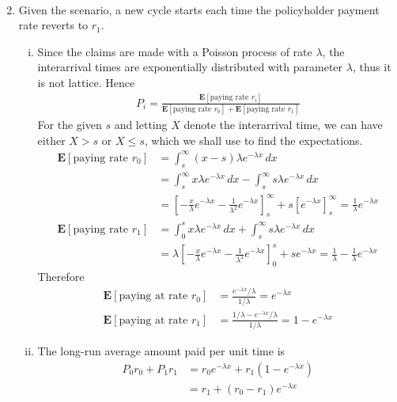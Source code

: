 \documentclass[a4paper,10pt]{article}
\theoremstyle{definition}
\begin{document}
\begin{enumerate}
\begin{align*}
\end{align*}
\item Given the scenario, a new cycle starts each time the policyholder payment rate reverts to $r_1$. 
\begin{enumerate}[(i)]
\item Since the claims are made with a Poisson process of rate $\lambda$, the interarrival times are exponentially distributed with parameter $\lambda$, thus it is not lattice. Hence
\begin{align*}
P_i=\frac{\mathbf{E}[\text{paying rate } r_i]}{\mathbf{E}[\text{paying rate } r_0]+\mathbf{E}[\text{paying rate } r_1]}
\end{align*}
For the given $s$ and letting $X$ denote the interarrival time, we can have either $X>s$ or $X \leq s$, which we shall use to find the expectations.
\begin{align*}
\mathbf{E}[\text{paying rate } r_0] &=\int_{s}^{\infty}(x-s)\lambda e^{-\lambda x}\,dx\\
&=\int_{s}^{\infty}x\lambda e^{-\lambda x}\,dx-\int_{s}^{\infty}s\lambda e^{-\lambda x}\,dx\\
&=\left[-\frac{x}{\lambda}e^{-\lambda x}-\frac{1}{\lambda^2}e^{-\lambda x}\right]_{s}^{\infty}+ s\left[e^{-\lambda x}\right]_{s}^{\infty}=\frac{1}{\lambda}e^{-\lambda x}\\
\mathbf{E}[\text{paying rate } r_1] &=\int_{0}^{s}x\lambda e^{-\lambda x}\,dx+\int_{s}^{\infty}s\lambda e^{-\lambda x}\,dx\\
&=\lambda\left[-\frac{x}{\lambda}e^{-\lambda x}-\frac{1}{\lambda^2}e^{-\lambda x}\right]_{0}^{s}+se^{-\lambda x}=\frac{1}{\lambda}-\frac{1}{\lambda}e^{-\lambda x}
\end{align*}
Therefore
\begin{align*}
\mathbf{E}[\text{paying at rate }r_0]&=\frac{e^{-\lambda x}/\lambda}{1/\lambda}=e^{-\lambda x} \\
\mathbf{E}[\text{paying at rate }r_1]&=\frac{1/\lambda -e^{-\lambda x}/\lambda}{1/\lambda} =1-e^{-\lambda x}
\end{align*}
\item The long-run average amount paid per unit time is 
\begin{align*}
P_0r_0+P_1r_1&=r_0e^{-\lambda x}+r_1(1-e^{-\lambda x})\\
&=r_1+(r_0-r_1)e^{-\lambda x}
\end{align*}
\end{enumerate}


\end{enumerate}
\end{document}
